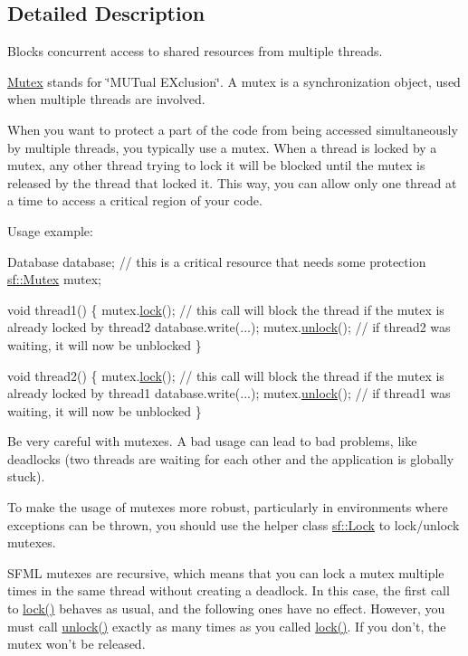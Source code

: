 \subsection{Detailed Description}
Blocks concurrent access to shared resources from multiple threads. 

\hyperlink{classsf_1_1Mutex}{Mutex} stands for \char`\"{}\-M\-U\-Tual E\-Xclusion\char`\"{}. A mutex is a synchronization object, used when multiple threads are involved.

When you want to protect a part of the code from being accessed simultaneously by multiple threads, you typically use a mutex. When a thread is locked by a mutex, any other thread trying to lock it will be blocked until the mutex is released by the thread that locked it. This way, you can allow only one thread at a time to access a critical region of your code.

Usage example\-: 
\begin{DoxyCode}
Database database; \textcolor{comment}{// this is a critical resource that needs some protection}
\hyperlink{classsf_1_1Mutex}{sf::Mutex} mutex;

\textcolor{keywordtype}{void} thread1()
\{
    mutex.\hyperlink{classsf_1_1Mutex_a1a16956a6bbea764480c1b80f2e45763}{lock}(); \textcolor{comment}{// this call will block the thread if the mutex is already locked by thread2}
    database.write(...);
    mutex.\hyperlink{classsf_1_1Mutex_ade71268ffc5e80756652058b01c23c33}{unlock}(); \textcolor{comment}{// if thread2 was waiting, it will now be unblocked}
\}

\textcolor{keywordtype}{void} thread2()
\{
    mutex.\hyperlink{classsf_1_1Mutex_a1a16956a6bbea764480c1b80f2e45763}{lock}(); \textcolor{comment}{// this call will block the thread if the mutex is already locked by thread1}
    database.write(...);
    mutex.\hyperlink{classsf_1_1Mutex_ade71268ffc5e80756652058b01c23c33}{unlock}(); \textcolor{comment}{// if thread1 was waiting, it will now be unblocked}
\}
\end{DoxyCode}


Be very careful with mutexes. A bad usage can lead to bad problems, like deadlocks (two threads are waiting for each other and the application is globally stuck).

To make the usage of mutexes more robust, particularly in environments where exceptions can be thrown, you should use the helper class \hyperlink{classsf_1_1Lock}{sf\-::\-Lock} to lock/unlock mutexes.

S\-F\-M\-L mutexes are recursive, which means that you can lock a mutex multiple times in the same thread without creating a deadlock. In this case, the first call to \hyperlink{classsf_1_1Mutex_a1a16956a6bbea764480c1b80f2e45763}{lock()} behaves as usual, and the following ones have no effect. However, you must call \hyperlink{classsf_1_1Mutex_ade71268ffc5e80756652058b01c23c33}{unlock()} exactly as many times as you called \hyperlink{classsf_1_1Mutex_a1a16956a6bbea764480c1b80f2e45763}{lock()}. If you don't, the mutex won't be released.


